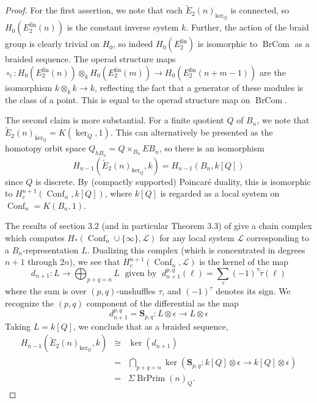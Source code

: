 \documentclass[12pt]{article}
\DeclareMathOperator{\Conf}{Conf}
\DeclareMathOperator{\fin}{fin}
\DeclareMathOperator{\BrPrim}{BrPrim}
\DeclareMathOperator{\BrCom}{BrCom}
\newcommand{\Ct} {\widetilde{E}}
\newcommand{\LL} {\mathcal{L}}
\newcommand{\bS} {\mathbf{S}}
\newcommand{\tautilde}{\widetilde{\tau}}
\theoremstyle{plain}
\theoremstyle{definition}
\theoremstyle{remark}
\begin{document}
\begin{proof}

For the first assertion, we note that each $\Ct_2(n)_{\ker_Q}$ is connected, so $H_0(E_2^{\fin}(n))$ is the constant inverse system $k$.  Further, the action of the braid group is clearly trivial on $H_0$, so indeed $H_0(E_2^{\fin})$ is isomorphic to $\BrCom$ as a braided sequence.  The operad structure maps $\circ_i: H_0(E_2^{\fin}(n)) \otimes_k H_0(E_2^{\fin}(m)) \to H_0(E_2^{\fin}(n+m-1))$ are the isomorphism $k \otimes_k k \to k$, reflecting the fact that a generator of these modules is the class of a point.  This is equal to the operad structure map on $\BrCom$.

The second claim is more substantial.  For a finite quotient $Q$ of $B_n$, we note that $\Ct_2(n)_{\ker_Q} = K(\ker_Q, 1)$.  This can alternatively be presented as the homotopy orbit space $Q_{hB_n} = Q \times_{B_n} EB_n$, so there is an isomorphism
%
$$H_{n-1}(\Ct_2(n)_{\ker_Q}, k) = H_{n-1}(B_n, k[Q])$$
%
since $Q$ is discrete.  By (compactly supported) Poincar\'e duality, this is isomorphic to $H^{n+1}_c(\Conf_n, k[Q])$, where $k[Q]$ is regarded as a local system on $\Conf_n = K(B_n, 1)$.  

The results of section 3.2 (and in particular Theorem 3.3) of \cite{etw} give a chain complex which computes $H_*(\Conf_n \cup \{\infty\}, \mathcal{L})$ for any local system $\LL$ corresponding to a $B_n$-representation $L$.  Dualizing this complex (which is concentrated in degrees $n+1$ through $2n$), we see that $H^{n+1}_c(\Conf_n, \LL)$ is the kernel of the map
%
$$d_{n+1}: L \to \bigoplus_{p+q = n} L \; \mbox{ given by } \; d^{p,q}_{n+1}(\ell) = \sum_{\tau} (-1)^{\tau}\tautilde(\ell)$$
%
where the sum is over $(p,q)$-unshuffles $\tau$, and $(-1)^{\tau}$ denotes its sign.  We recognize the $(p,q)$ component of the differential as the map
%
$$d^{p, q}_{n+1} = \bS_{p,q}: L \otimes \epsilon \to L \otimes \epsilon$$
%
Taking $L = k[Q]$, we conclude that as a braided sequence, 
%
\begin{eqnarray*}
H_{n-1}(\Ct_2(n)_{\ker_Q}, k) & \cong & \ker(d_{n+1})\\
 & = & \bigcap_{p+q = n} \ker(\bS_{p,q}: k[Q] \otimes \epsilon \to k[Q] \otimes \epsilon)\\
 & = & \Sigma \BrPrim(n)_Q.
\end{eqnarray*} 


\end{proof}
\end{document}
